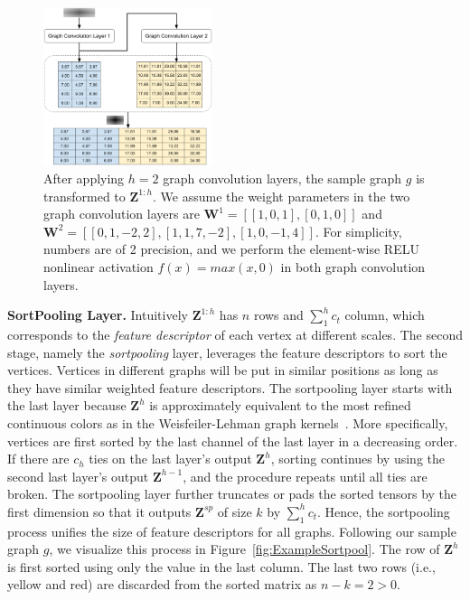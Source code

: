 \begin{figure}[htbp]
\centerline{\includegraphics[width=0.44\textwidth]{Magic/figures/ExampleGraphConvolution.eps}}
\caption{After applying $h=2$ graph convolution layers, the sample graph $g$ is transformed to $\mathbf{Z}^{1:h}$.
We assume the weight parameters in the two graph convolution layers are $\mathbf{W}^1 = [[1, 0 ,1], [0, 1, 0]]$ and $\mathbf{W}^2 = [[0, 1 ,-2, 2], [1, 1, 7, -2], [1, 0, -1, 4]]$.
For simplicity, numbers are of 2 precision, and we perform the element-wise RELU nonlinear activation $f(x) = max(x, 0)$ in both graph convolution layers.}
\label{fig:ExampleGraphConvolution}
\end{figure}

\textbf{SortPooling Layer.} Intuitively $\mathbf{Z}^{1:h}$ has $n$ rows and $\sum_{1}^{h}c_t$ column, which
corresponds to the \textit{feature descriptor} of each vertex at different scales.
The second stage, namely the \textit{sortpooling} layer,
leverages the feature descriptors to sort the vertices.
Vertices in different graphs will be put in similar positions as long as they have similar weighted feature descriptors.
The sortpooling layer starts with the last layer because $\mathbf{Z}^{h}$ is approximately
equivalent to the most refined continuous colors as in the Weisfeiler-Lehman graph kernels~\cite{WlGraphKernel}.
More specifically, vertices are first sorted by the last channel of the last layer in a decreasing order.
If there are $c_h$ ties on the last layer's output $\mathbf{Z}^{h}$,
sorting continues by using the second last layer's output $\mathbf{Z}^{h - 1}$, and the procedure repeats until all ties are broken.
The sortpooling layer further truncates or pads the sorted tensors by the first dimension so that it outputs $\mathbf{Z}^{sp}$ of size $k$ by $\sum_{1}^{h}c_t$.
Hence, the sortpooling process unifies the size of feature descriptors for all graphs.
Following our sample graph $g$, we visualize this process in Figure~\ref{fig:ExampleSortpool}.
The row of $\mathbf{Z}^{h}$ is first sorted using only the value in the last column.
The last two rows (i.e., yellow and red) are discarded from the sorted matrix as $n - k = 2 > 0$.

